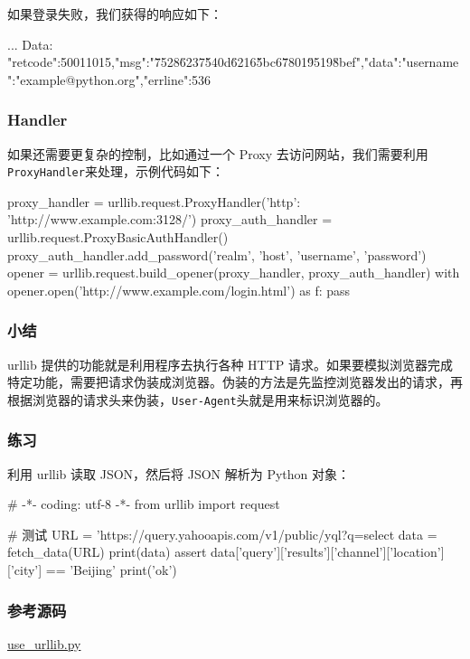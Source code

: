 如果登录失败，我们获得的响应如下：

\begin{pythoncode}
...
Data: {"retcode":50011015,"msg":"\u7528\u6237\u540d\u6216\u5bc6\u7801\u9519\u8bef","data":{"username":"example@python.org","errline":536}}
\end{pythoncode}

\hypertarget{handler}{%
\subsubsection{Handler}\label{handler}}

如果还需要更复杂的控制，比如通过一个 Proxy
去访问网站，我们需要利用\texttt{ProxyHandler}来处理，示例代码如下：

\begin{pythoncode}
proxy_handler = urllib.request.ProxyHandler({'http': 'http://www.example.com:3128/'})
proxy_auth_handler = urllib.request.ProxyBasicAuthHandler()
proxy_auth_handler.add_password('realm', 'host', 'username', 'password')
opener = urllib.request.build_opener(proxy_handler, proxy_auth_handler)
with opener.open('http://www.example.com/login.html') as f:
    pass
\end{pythoncode}

\hypertarget{ux5c0fux7ed3}{%
\subsubsection{小结}\label{ux5c0fux7ed3}}

urllib 提供的功能就是利用程序去执行各种 HTTP
请求。如果要模拟浏览器完成特定功能，需要把请求伪装成浏览器。伪装的方法是先监控浏览器发出的请求，再根据浏览器的请求头来伪装，\texttt{User-Agent}头就是用来标识浏览器的。

\hypertarget{ux7ec3ux4e60}{%
\subsubsection{练习}\label{ux7ec3ux4e60}}

利用 urllib 读取 JSON，然后将 JSON 解析为 Python 对象：

\begin{pythoncode}
# -*- coding: utf-8 -*-
from urllib import request
\end{pythoncode}

\begin{pythoncode}
# 测试
URL = 'https://query.yahooapis.com/v1/public/yql?q=select%
data = fetch_data(URL)
print(data)
assert data['query']['results']['channel']['location']['city'] == 'Beijing'
print('ok')
\end{pythoncode}

\hypertarget{ux53c2ux8003ux6e90ux7801}{%
\subsubsection{参考源码}\label{ux53c2ux8003ux6e90ux7801}}

\href{https://github.com/michaelliao/learn-python3/blob/master/samples/commonlib/use_urllib.py}{use\_urllib.py}

